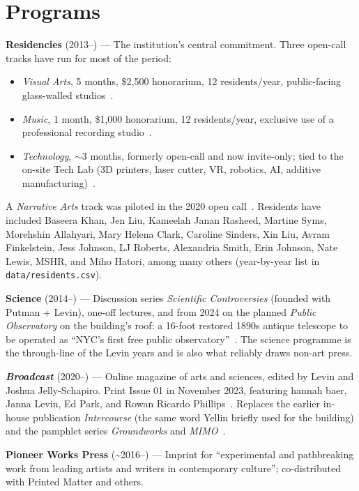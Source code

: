 \documentclass[10pt,letterpaper,twocolumn]{article}
\begin{document}
\section{Programs}

\textbf{Residencies} (2013--) --- The institution's central commitment. Three open-call tracks have run for most of the period:

\begin{itemize}
\item \emph{Visual Arts}, 5 months, \$2{,}500 honorarium, 12 residents/year, public-facing glass-walled studios~\citep{artdeadline2026residency}.
\item \emph{Music}, 1 month, \$1{,}000 honorarium, 12 residents/year, exclusive use of a professional recording studio~\citep{artdeadline2026residency}.
\item \emph{Technology}, $\sim$3 months, formerly open-call and now invite-only; tied to the on-site Tech Lab (3D printers, laser cutter, VR, robotics, AI, additive manufacturing)~\citep{pioneerworks2025tech}.
\end{itemize}
A \emph{Narrative Arts} track was piloted in the 2020 open call~\citep{hyperallergic2019openall}. Residents have included Baseera Khan, Jen Liu, Kameelah Janan Rasheed, Martine Syms, Morehshin Allahyari, Mary Helena Clark, Caroline Sinders, Xin Liu, Avram Finkelstein, Jess Johnson, LJ Roberts, Alexandria Smith, Erin Johnson, Nate Lewis, MSHR, and Miho Hatori, among many others (year-by-year list in \texttt{data/residents.csv}).

\textbf{Science} (2014--) --- Discussion series \emph{Scientific Controversies} (founded with Putman + Levin), one-off lectures, and from 2024 on the planned \emph{Public Observatory} on the building's roof: a 16-foot restored 1890s antique telescope to be operated as ``NYC's first free public observatory''~\citep{surface2024obs}. The science programme is the through-line of the Levin years and is also what reliably draws non-art press.

\textbf{\emph{Broadcast}} (2020--) --- Online magazine of arts and sciences, edited by Levin and Joshua Jelly-Schapiro. Print Issue 01 in November 2023, featuring hannah baer, Janna Levin, Ed Park, and Rowan Ricardo Phillips~\citep{starrevue2024broadcast}. Replaces the earlier in-house publication \emph{Intercourse} (the same word Yellin briefly used for the building) and the pamphlet series \emph{Groundworks} and \emph{MIMO}~\citep{fvf2017pioneer}.

\textbf{Pioneer Works Press} (\textasciitilde 2016--) --- Imprint for ``experimental and pathbreaking work from leading artists and writers in contemporary culture''; co-distributed with Printed Matter and others.
\end{document}

